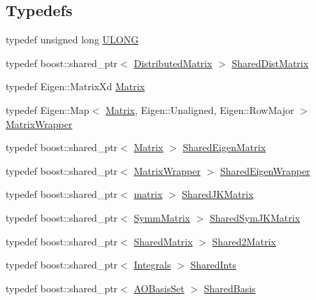 \subsection*{Typedefs}
\begin{DoxyCompactItemize}
\item 
typedef unsigned long \hyperlink{namespaceJKBuilder_af632da489ebc3708ec3ab6791ee53fa4}{ULONG}
\item 
typedef boost::shared\_\-ptr$<$ \hyperlink{classJKBuilder_1_1DistributedMatrix}{DistributedMatrix} $>$ \hyperlink{namespaceJKBuilder_a3b337e72f5cb0686ec93e063dda09c70}{SharedDistMatrix}
\item 
typedef Eigen::MatrixXd \hyperlink{namespaceJKBuilder_adfecb398197e2c871cba88a5f9f3c5fe}{Matrix}
\item 
typedef Eigen::Map$<$ \hyperlink{namespaceJKBuilder_adfecb398197e2c871cba88a5f9f3c5fe}{Matrix}, Eigen::Unaligned, Eigen::RowMajor $>$ \hyperlink{namespaceJKBuilder_a3f2825245708c24ccca9ddcadca9754d}{MatrixWrapper}
\item 
typedef boost::shared\_\-ptr$<$ \hyperlink{namespaceJKBuilder_adfecb398197e2c871cba88a5f9f3c5fe}{Matrix} $>$ \hyperlink{namespaceJKBuilder_a36fdf7f9a8c81e7ddac62fddb1996ab3}{SharedEigenMatrix}
\item 
typedef boost::shared\_\-ptr$<$ \hyperlink{namespaceJKBuilder_a3f2825245708c24ccca9ddcadca9754d}{MatrixWrapper} $>$ \hyperlink{namespaceJKBuilder_ad018675eed9ebe499b95822286a7e912}{SharedEigenWrapper}
\item 
typedef boost::shared\_\-ptr$<$ \hyperlink{classJKBuilder_1_1matrix}{matrix} $>$ \hyperlink{namespaceJKBuilder_ad6c4232cd3938548f4ad3a91fbc5a2e8}{SharedJKMatrix}
\item 
typedef boost::shared\_\-ptr$<$ \hyperlink{classJKBuilder_1_1SymmMatrix}{SymmMatrix} $>$ \hyperlink{namespaceJKBuilder_aef21bc37b7cf7bc5ebb5a48628db8d0f}{SharedSymJKMatrix}
\item 
typedef boost::shared\_\-ptr$<$ \hyperlink{classJKBuilder_1_1SharedMatrix}{SharedMatrix} $>$ \hyperlink{namespaceJKBuilder_a490b0a0cd0b0f8f0e280e29b03eb51a3}{Shared2Matrix}
\item 
typedef boost::shared\_\-ptr$<$ \hyperlink{classJKBuilder_1_1Integrals}{Integrals} $>$ \hyperlink{namespaceJKBuilder_a5f21cc1a0cc795f1cb9aceca0400dcd0}{SharedInts}
\item 
typedef boost::shared\_\-ptr$<$ \hyperlink{classJKBuilder_1_1AOBasisSet}{AOBasisSet} $>$ \hyperlink{namespaceJKBuilder_aa50d645c83645be7de5fa94937abf1f3}{SharedBasis}
\end{DoxyCompactItemize}
